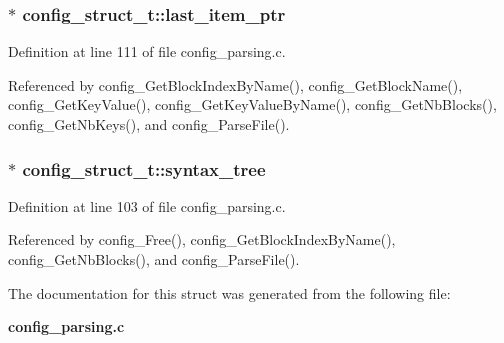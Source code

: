 \subsubsection{$\ast$ {\bf config\_\-struct\_\-t::last\_\-item\_\-ptr}}\label{structconfig__struct__t_o2}




Definition at line 111 of file config\_\-parsing.c.

Referenced by config\_\-Get\-Block\-Index\-By\-Name(), config\_\-Get\-Block\-Name(), config\_\-Get\-Key\-Value(), config\_\-Get\-Key\-Value\-By\-Name(), config\_\-Get\-Nb\-Blocks(), config\_\-Get\-Nb\-Keys(), and config\_\-Parse\-File().
\subsubsection{$\ast$ {\bf config\_\-struct\_\-t::syntax\_\-tree}}\label{structconfig__struct__t_o0}




Definition at line 103 of file config\_\-parsing.c.

Referenced by config\_\-Free(), config\_\-Get\-Block\-Index\-By\-Name(), config\_\-Get\-Nb\-Blocks(), and config\_\-Parse\-File().

The documentation for this struct was generated from the following file:\begin{CompactItemize}
\item 
{\bf config\_\-parsing.c}\end{CompactItemize}

